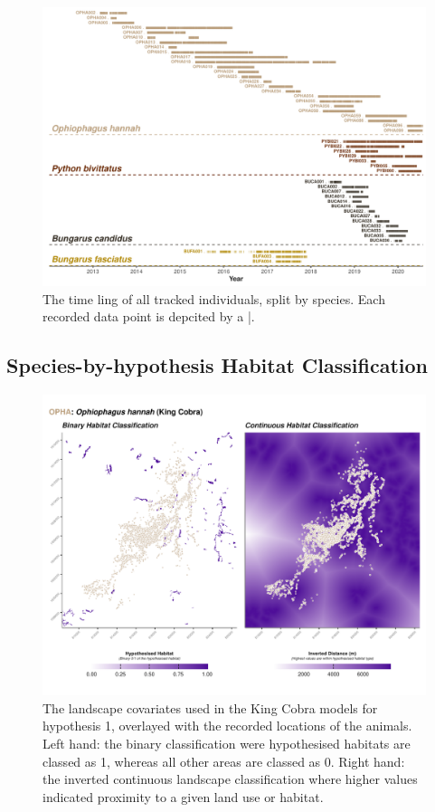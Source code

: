 \documentclass[10pt,a4paper]{article}
\begin{document}
\begin{figure}
\includegraphics[width=1\linewidth]{../../figures/timeLinePlot} \caption{The time ling of all tracked individuals, split by species. Each recorded data point is depcited by a |.}\label{fig:timeLinePlot}
\end{figure}

\subsection{Species-by-hypothesis Habitat Classification}\label{species-by-hypothesis-habitat-classification}

\begin{figure}
\includegraphics[width=1\linewidth]{../../figures/landscape_plot_OPHA_H1} \caption{The landscape covariates used in the King Cobra models for hypothesis 1, overlayed with the recorded locations of the animals. Left hand: the binary classification were hypothesised habitats are classed as 1, whereas all other areas are classed as 0. Right hand: the inverted continuous landscape classification where higher values indicated proximity to a given land use or habitat.}\label{fig:landscapePlotOPHA1}
\end{figure}
\end{document}
